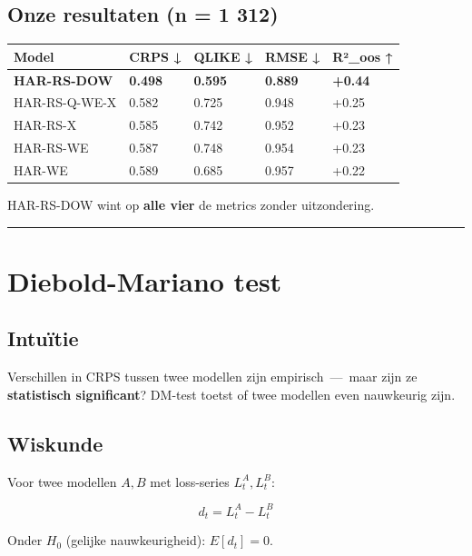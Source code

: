 \documentclass[11pt,a4paper]{article}
\begin{document}
\hypertarget{onze-resultaten-n-1-312}{%
\subsection{Onze resultaten (n = 1 312)}\label{onze-resultaten-n-1-312}}

\begin{longtable}[]{@{}lllll@{}}
\toprule
Model & CRPS ↓ & QLIKE ↓ & RMSE ↓ & R²\_oos ↑ \\
\midrule
\endhead
\textbf{HAR-RS-DOW} & \textbf{0.498} & \textbf{0.595} & \textbf{0.889} & \textbf{+0.44} \\
HAR-RS-Q-WE-X & 0.582 & 0.725 & 0.948 & +0.25 \\
HAR-RS-X & 0.585 & 0.742 & 0.952 & +0.23 \\
HAR-RS-WE & 0.587 & 0.748 & 0.954 & +0.23 \\
HAR-WE & 0.589 & 0.685 & 0.957 & +0.22 \\
\bottomrule
\end{longtable}

HAR-RS-DOW wint op \textbf{alle vier} de metrics zonder uitzondering.

\begin{center}\rule{0.5\linewidth}{0.5pt}\end{center}

\hypertarget{diebold-mariano-test}{%
\section{Diebold-Mariano test}\label{diebold-mariano-test}}

\hypertarget{intuuxeftie-8}{%
\subsection{Intuïtie}\label{intuuxeftie-8}}

Verschillen in CRPS tussen twee modellen zijn empirisch \,---\, maar zijn ze \textbf{statistisch significant}? DM-test toetst of twee modellen even nauwkeurig zijn.

\hypertarget{wiskunde-2}{%
\subsection{Wiskunde}\label{wiskunde-2}}

Voor twee modellen \(A, B\) met loss-series \(L_t^A, L_t^B\):

\[d_t = L_t^A - L_t^B\]

Onder \(H_0\) (gelijke nauwkeurigheid): \(E[d_t] = 0\).
\end{document}

